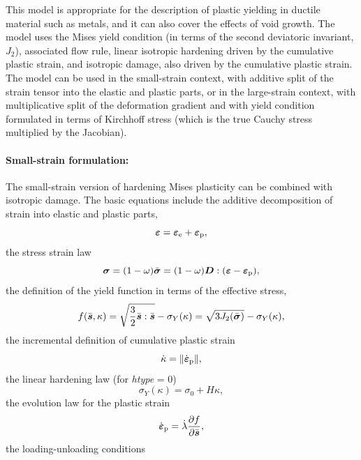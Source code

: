 \documentclass[a4paper]{article}
\newcommand{\mbf}[1]{\mbox{\boldmath$#1$}}
\newcommand{\param}[1]{{\it #1}}
\newcommand{\eps} {\mbf{\varepsilon}}
\newcommand{\epspd} {\dot{\eps}_{\mathrm{p}}}
\newcommand{\veps}{\mbf{\varepsilon}}  %
\newcommand{\vsig}{\mbf{\sigma}}%
\newcommand{\vs}{\mbf{s}}%
\begin{document}
This model is appropriate for the description of plastic yielding in ductile material such as metals, and it can also cover the effects of void growth.
The model uses the Mises yield condition (in terms of the second deviatoric invariant, $J_2$),
associated flow rule, linear isotropic hardening driven by the cumulative plastic strain,
and isotropic damage, also driven by the cumulative plastic strain. The model can be used in the small-strain context, with additive split 
of the strain tensor into the elastic and plastic parts, or in the large-strain context,
with multiplicative split of the deformation gradient and with yield condition formulated in terms of Kirchhoff stress (which is the true Cauchy stress multiplied by the Jacobian).

\paragraph{Small-strain formulation:}
The small-strain version of hardening Mises plasticity can be combined with isotropic damage.
The basic equations include the additive decomposition of strain into elastic and plastic parts,
\begin{equation}\label{VMadditiveDecomposition}
\veps = \veps_{\rm{e}} + \veps_{\rm{p}},
\end{equation}
the stress strain law 
\begin{equation}\label{VMconstitutiveEquation}
\vsig = (1-\omega)\bar{\vsig}=(1-\omega)\mbf{D} :(\veps-\veps_{\rm{p}}),
\end{equation}
the definition of the yield function in terms of the effective stress,
\begin{equation}\label{VMvonMisesCondition}
f(\bar{\vs},\kappa) = \sqrt{\frac{3}{2}\bar{\vs}:\bar{\vs}}-\sigma_Y(\kappa) = \sqrt{3 J_2(\bar{\vsig})}-\sigma_Y(\kappa),
\end{equation}
the incremental definition of cumulative plastic strain
\begin{equation}\label{VMcumPlasStrain}
\dot{\kappa} = \| \epspd \|,
\end{equation}
the linear hardening law (for \param{htype} = 0)
\begin{equation}\label{VMlinearHardeningLaw}
\sigma_Y(\kappa) = \sigma_0 + H\kappa,
\end{equation}
the evolution law for the plastic strain
\begin{equation}
 \epspd = \dot{\lambda}\frac{\partial f}{\partial \bar{\vs}},
\end{equation}
the loading-unloading conditions
\end{document}
